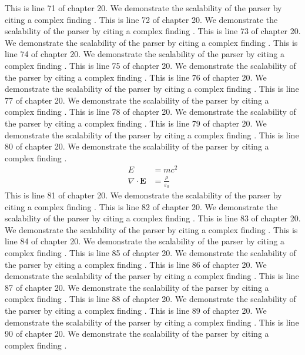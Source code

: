 This is line 71 of chapter 20. We demonstrate the scalability of the parser by citing a complex finding \cite{ref20_71}.
This is line 72 of chapter 20. We demonstrate the scalability of the parser by citing a complex finding \cite{ref20_72}.
This is line 73 of chapter 20. We demonstrate the scalability of the parser by citing a complex finding \cite{ref20_73}.
This is line 74 of chapter 20. We demonstrate the scalability of the parser by citing a complex finding \cite{ref20_74}.
This is line 75 of chapter 20. We demonstrate the scalability of the parser by citing a complex finding \cite{ref20_75}.
This is line 76 of chapter 20. We demonstrate the scalability of the parser by citing a complex finding \cite{ref20_76}.
This is line 77 of chapter 20. We demonstrate the scalability of the parser by citing a complex finding \cite{ref20_77}.
This is line 78 of chapter 20. We demonstrate the scalability of the parser by citing a complex finding \cite{ref20_78}.
This is line 79 of chapter 20. We demonstrate the scalability of the parser by citing a complex finding \cite{ref20_79}.
This is line 80 of chapter 20. We demonstrate the scalability of the parser by citing a complex finding \cite{ref20_80}.
\begin{align*}
  E &= mc^2 \\
  \nabla \cdot \mathbf{E} &= \frac{\rho}{\varepsilon_0}
\end{align*}
This is line 81 of chapter 20. We demonstrate the scalability of the parser by citing a complex finding \cite{ref20_81}.
This is line 82 of chapter 20. We demonstrate the scalability of the parser by citing a complex finding \cite{ref20_82}.
This is line 83 of chapter 20. We demonstrate the scalability of the parser by citing a complex finding \cite{ref20_83}.
This is line 84 of chapter 20. We demonstrate the scalability of the parser by citing a complex finding \cite{ref20_84}.
This is line 85 of chapter 20. We demonstrate the scalability of the parser by citing a complex finding \cite{ref20_85}.
This is line 86 of chapter 20. We demonstrate the scalability of the parser by citing a complex finding \cite{ref20_86}.
This is line 87 of chapter 20. We demonstrate the scalability of the parser by citing a complex finding \cite{ref20_87}.
This is line 88 of chapter 20. We demonstrate the scalability of the parser by citing a complex finding \cite{ref20_88}.
This is line 89 of chapter 20. We demonstrate the scalability of the parser by citing a complex finding \cite{ref20_89}.
This is line 90 of chapter 20. We demonstrate the scalability of the parser by citing a complex finding \cite{ref20_90}.

